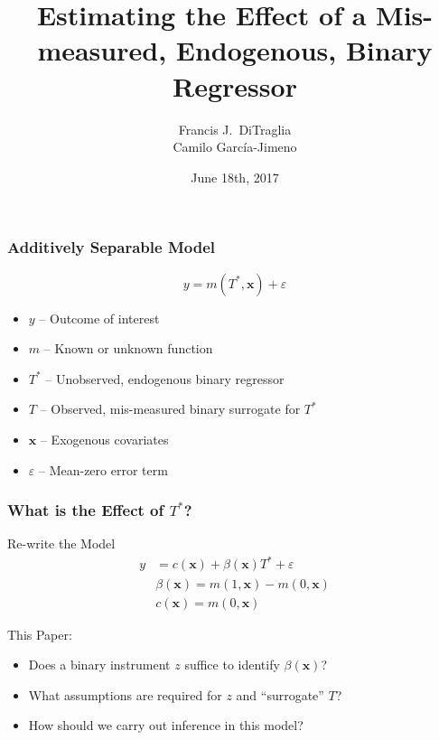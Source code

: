 \documentclass{beamer}
\title[Binary Regressors]{Estimating the Effect of a Mis-measured, Endogenous, Binary Regressor}
\author[FJ DiTraglia]{Francis J.\ DiTraglia\\ Camilo Garc\'{i}a-Jimeno}
\institute{University of Pennsylvania}
\date{June 18th, 2017}
\begin{document}
 

\begin{frame}[plain]
	\titlepage 
\end{frame} 
\begin{frame}
  \frametitle{Additively Separable Model}
\[
  y = m(T^*, \mathbf{x}) + \varepsilon
\]
\vspace{-1em}
    \begin{itemize}    
    \item $y$ -- Outcome of interest
    \item $m$ -- Known or unknown function 
    \item $T^*$ -- Unobserved, endogenous binary regressor
    \item $T$ -- Observed, mis-measured binary surrogate for $T^*$
    \item $\mathbf{x}$ -- Exogenous covariates
    \item $\varepsilon$ -- Mean-zero error term
  \end{itemize}

\end{frame}
\begin{frame}
  \frametitle{What is the Effect of $T^*$?}
 
  \begin{block}{Re-write the Model}
\begin{align*}
  y &= c(\mathbf{x}) + \beta(\mathbf{x}) T^* + \varepsilon\\
  &\beta(\mathbf{x}) = m(1,\mathbf{x}) - m(0,\mathbf{x})\\
  &c(\mathbf{x}) = m(0,\mathbf{x})
\end{align*}
  \end{block}

  \begin{alertblock}{This Paper:}
    \begin{itemize}
      \item Does a binary instrument $z$ suffice to identify $\beta(\mathbf{x})$? 
      \item What assumptions are required for $z$ and ``surrogate'' $T$? 
      \item How should we carry out inference in this model?
    \end{itemize}
  \end{alertblock}
\end{frame}
\end{document}
